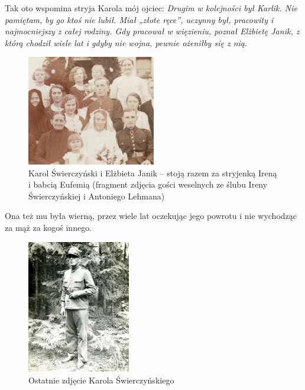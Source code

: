 Tak oto wspomina stryja Karola mój ojciec: \textit{Drugim w kolejności był Karlik. Nie pamiętam, by go ktoś nie lubił. Miał „złote ręce”, uczynny był, pracowity i najmocniejszy z całej rodziny. Gdy pracował w więzieniu, poznał Elżbietę Janik, z którą chodził wiele lat i gdyby nie wojna, pewnie ożeniłby się z nią}.

\begin{figure}[!h]
\begin{center}
\includegraphics[width=0.5\textwidth]{photo/irena_antoni_lehman_slub_1.jpg}
\caption[Karol Świerczyński i Elżbieta Janik]{Karol Świerczyński i Elżbieta Janik -- stoją razem za stryjenką Ireną i babcią Eufemią (fragment zdjęcia gości weselnych ze ślubu Ireny Świerczyńskiej i Antoniego Lehmana)}
\label{rys:irena_antoni_lehman_slub_1}
\end{center}
\end{figure}

Ona też mu była wierną, przez wiele lat oczekując jego powrotu i nie wychodząc za mąż za kogoś innego.

\begin{figure}[!h]
\begin{center}
\includegraphics[width=0.4\textwidth]{photo/karol_swierczynski_3.jpg}
\caption{Ostatnie zdjęcie Karola Świerczyńskiego}
\label{rys:karol_swierczynski_3}
\end{center}
\end{figure}

